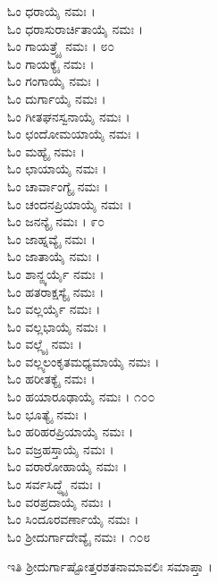 \begin{multicols}{2}
ಓಂ ಧರಾಯೈ ನಮಃ ।\\
ಓಂ ಧರಾಸುರಾರ್ಚಿತಾಯೈ ನಮಃ ।\\
ಓಂ ಗಾಯತ್ರ್ಯೈ ನಮಃ । ೮೦\\
ಓಂ ಗಾಯಕ್ಯೈ ನಮಃ ।\\
ಓಂ ಗಂಗಾಯೈ ನಮಃ ।\\
ಓಂ ದುರ್ಗಾಯೈ ನಮಃ ।\\
ಓಂ ಗೀತಘನಸ್ವನಾಯೈ ನಮಃ ।\\
ಓಂ ಛಂದೋಮಯಾಯೈ ನಮಃ ।\\
ಓಂ ಮಹ್ಯೈ ನಮಃ ।\\
ಓಂ ಛಾಯಾಯೈ ನಮಃ ।\\
ಓಂ ಚಾರ್ವಾಂಗ್ಯೈ ನಮಃ ।\\
ಓಂ ಚಂದನಪ್ರಿಯಾಯೈ ನಮಃ ।\\
ಓಂ ಜನನ್ಯೈ ನಮಃ । ೯೦\\
ಓಂ ಜಾಹ್ನವ್ಯೈ ನಮಃ ।\\
ಓಂ ಜಾತಾಯೈ ನಮಃ ।\\
ಓಂ ಶಾನ್ಙ್ಕರ್ಯೈ ನಮಃ ।\\
ಓಂ ಹತರಾಕ್ಷಸ್ಯೈ ನಮಃ ।\\
ಓಂ ವಲ್ಲರ್ಯೈ ನಮಃ ।\\
ಓಂ ವಲ್ಲಭಾಯೈ ನಮಃ ।\\
ಓಂ ವಲ್ಲ್ಯೈ ನಮಃ ।\\
ಓಂ ವಲ್ಲ್ಯಲಂಕೃತಮಧ್ಯಮಾಯೈ ನಮಃ ।\\
ಓಂ ಹರೀತಕ್ಯೈ ನಮಃ ।\\
ಓಂ ಹಯಾರೂಢಾಯೈ ನಮಃ । ೧೦೦\\
ಓಂ ಭೂತ್ಯೈ ನಮಃ ।\\
ಓಂ ಹರಿಹರಪ್ರಿಯಾಯೈ ನಮಃ ।\\
ಓಂ ವಜ್ರಹಸ್ತಾಯೈ ನಮಃ ।\\
ಓಂ ವರಾರೋಹಾಯೈ ನಮಃ ।\\
ಓಂ ಸರ್ವಸಿದ್ಧ್ಯೈ ನಮಃ ।\\
ಓಂ ವರಪ್ರದಾಯೈ ನಮಃ ।\\
ಓಂ ಸಿಂದೂರವರ್ಣಾಯೈ ನಮಃ ।\\
ಓಂ ಶ್ರೀದುರ್ಗಾದೇವ್ಯೈ ನಮಃ । ೧೦೮
\end{multicols}
ಇತಿ ಶ್ರೀದುರ್ಗಾಷ್ಟೋತ್ತರಶತನಾಮಾವಲಿಃ ಸಮಾಪ್ತಾ ।
